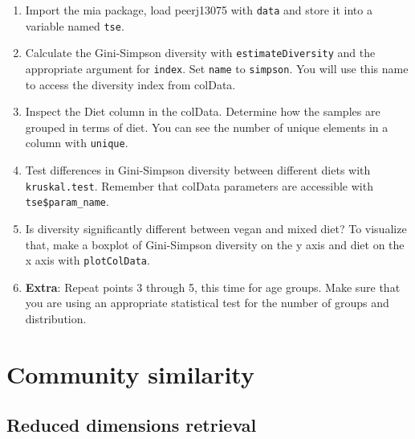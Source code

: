 \documentclass[
]{book}
\providecommand{\tightlist}{%
  \setlength{\itemsep}{0pt}\setlength{\parskip}{0pt}}
\begin{document}
\begin{enumerate}
\def\labelenumi{\arabic{enumi}.}
\tightlist
\item
  Import the mia package, load peerj13075 with \texttt{data} and store it into a
  variable named \texttt{tse}.
\item
  Calculate the Gini-Simpson diversity with \texttt{estimateDiversity} and the
  appropriate argument for \texttt{index}. Set \texttt{name} to \texttt{simpson}. You will use this
  name to access the diversity index from colData.
\item
  Inspect the Diet column in the colData. Determine how the samples are grouped
  in terms of diet. You can see the number of unique elements in a column with
  \texttt{unique}.
\item
  Test differences in Gini-Simpson diversity between different diets with
  \texttt{kruskal.test}. Remember that colData parameters are accessible with
  \texttt{tse\$param\_name}.
\item
  Is diversity significantly different between vegan and mixed diet? To
  visualize that, make a boxplot of Gini-Simpson diversity on the y axis and
  diet on the x axis with \texttt{plotColData}.
\item
  \textbf{Extra}: Repeat points 3 through 5, this time for age groups. Make sure
  that you are using an appropriate statistical test for the number of groups
  and distribution.
\end{enumerate}

\hypertarget{community-similarity-1}{%
\section{Community similarity}\label{community-similarity-1}}

\hypertarget{reduced-dimensions-retrieval}{%
\subsection{Reduced dimensions retrieval}\label{reduced-dimensions-retrieval}}
\end{document}

